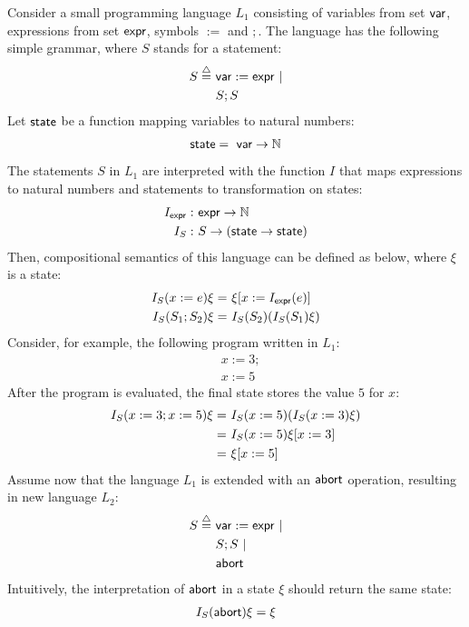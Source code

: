 \begin{example}
Consider a small programming language $L_1$ consisting of variables from set $\mathsf{var}$, expressions from set $\mathsf{expr}$, symbols $:=$ and $;$. The language has the following simple grammar, where $S$ stands for a statement:
\begin{align}
S  \stackrel{{\scriptstyle\triangle}}{=} \ & \mathsf{var} := \mathsf{expr} \ | \notag \\
&  S;S \notag
\end{align}
Let $\mathsf{state}$ be a function mapping variables to natural numbers:
\begin{align}
\mathsf{state} = \ \mathsf{var} \rightarrow \mathbb{N} \notag
\end{align}
The statements $S$ in $L_1$ are interpreted with the function $I$ that maps expressions to natural numbers and statements to transformation on states:
\begin{align}
I_{\mathsf{expr}}: \ & \mathsf{expr} \rightarrow \mathbb{N} \notag \\
I_{S}: \ & S \rightarrow (\mathsf{state} \rightarrow \mathsf{state}) \notag 
\end{align}
Then, compositional semantics of this language can be defined as below, where $\xi$ is a state:
\begin{align}
I_{S}(x:=e)\xi = \ & \xi[x := I_{\mathsf{expr}}(e)] \notag \\
I_{S}(S_1;S_2)\xi = \ & I_S(S_2)(I_S(S_1)\xi) \notag 
\end{align}
Consider, for example, the following program written in $L_1$:
\begin{align*}
& x:= 3; \\
& x:= 5
\end{align*}
After the program is evaluated, the final state stores the value $5$ for $x$:
\begin{align}
I_S(x:=3; x:=5)\xi  = \ & I_S(x:=5)(I_S(x:=3)\xi ) \notag \\
= \ & I_S(x:=5) \xi [ x:=3 ]  \notag \\
= \ & \xi [ x:=5] \notag
\end{align}
Assume now that the language $L_1$ is extended with an $\mathsf{abort}$ operation, resulting in new language $L_2$: 
\begin{align}
S  \stackrel{{\scriptstyle\triangle}}{=} \ & \mathsf{var} := \mathsf{expr} \ | \notag \\
& S;S \ | \notag \\
& \mathsf{abort} \notag
\end{align}
Intuitively, the interpretation of $\mathsf{abort}$ in a state $\xi$ should return the same state:
\begin{align}
I_{S}(\abort)\xi = \xi \notag

\end{align}
\end{example}
